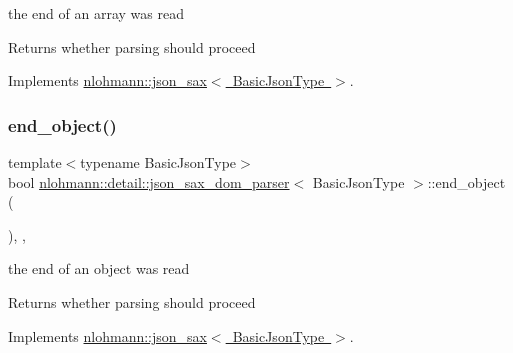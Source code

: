 the end of an array was read 

\begin{DoxyReturn}{Returns}
whether parsing should proceed 
\end{DoxyReturn}


Implements \mbox{\hyperlink{structnlohmann_1_1json__sax_a235ee975617f28e6a996d1e36a282312}{nlohmann\+::json\+\_\+sax$<$ Basic\+Json\+Type $>$}}.

\mbox{\label{classnlohmann_1_1detail_1_1json__sax__dom__parser_a0ed3d660d7d97411fdebeba233b4d994}} 
\subsubsection{\texorpdfstring{end\+\_\+object()}{end\_object()}}
{\footnotesize\ttfamily template$<$typename Basic\+Json\+Type$>$ \\
bool \mbox{\hyperlink{classnlohmann_1_1detail_1_1json__sax__dom__parser}{nlohmann\+::detail\+::json\+\_\+sax\+\_\+dom\+\_\+parser}}$<$ Basic\+Json\+Type $>$\+::end\+\_\+object (\begin{DoxyParamCaption}{ }\end{DoxyParamCaption})\hspace{0.3cm}{\ttfamily [inline]}, {\ttfamily [override]}, {\ttfamily [virtual]}}



the end of an object was read 

\begin{DoxyReturn}{Returns}
whether parsing should proceed 
\end{DoxyReturn}


Implements \mbox{\hyperlink{structnlohmann_1_1json__sax_ad0c722d53ff97be700ccf6a9468bd456}{nlohmann\+::json\+\_\+sax$<$ Basic\+Json\+Type $>$}}.

\mbox{\label{classnlohmann_1_1detail_1_1json__sax__dom__parser_a76014cffa8ce9c4bb4b25a538c5a3920}} 
